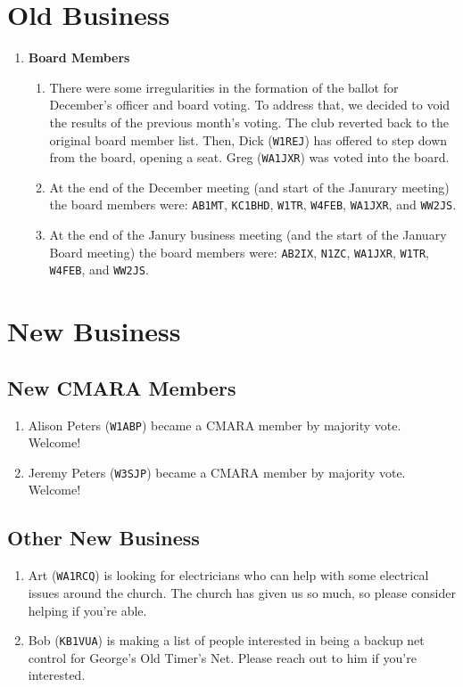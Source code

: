 \documentclass[10pt,letterpaper]{article}
\begin{document}
\section{Old Business}
\begin{enumerate}
  \item \textbf{Board Members}
  \begin{enumerate}
    \item There were some irregularities in the formation of the ballot for December's officer and board voting. To address that, we decided to void the results of the previous month's voting. The club reverted back to the original board member list. Then, Dick (\texttt{W1REJ}) has offered to step down from the board, opening a seat. Greg (\texttt{WA1JXR}) was voted into the board.
    \item At the end of the December meeting (and start of the Janurary meeting) the board members were: \texttt{AB1MT}, \texttt{KC1BHD}, \texttt{W1TR}, \texttt{W4FEB}, \texttt{WA1JXR}, and \texttt{WW2JS}.
    \item At the end of the Janury business meeting (and the start of the January Board meeting) the board members were: \texttt{AB2IX}, \texttt{N1ZC}, \texttt{WA1JXR}, \texttt{W1TR}, \texttt{W4FEB}, and \texttt{WW2JS}.
  \end{enumerate}
\end{enumerate}

\section{New Business}

\subsection{New CMARA Members}
\label{new-cmara-members}
\begin{enumerate}
  \item Alison Peters (\texttt{W1ABP}) became a CMARA member by majority vote. Welcome!
  \item Jeremy Peters (\texttt{W3SJP}) became a CMARA member by majority vote. Welcome!
\end{enumerate}

\subsection{Other New Business}
\begin{enumerate}
  \item Art (\texttt{WA1RCQ}) is looking for electricians who can help with some electrical issues around the church. The church has given us so much, so please consider helping if you're able.
  \item Bob (\texttt{KB1VUA}) is making a list of people interested in being a backup net control for George's Old Timer's Net. Please reach out to him if you're interested.
\end{enumerate}
\end{document}
